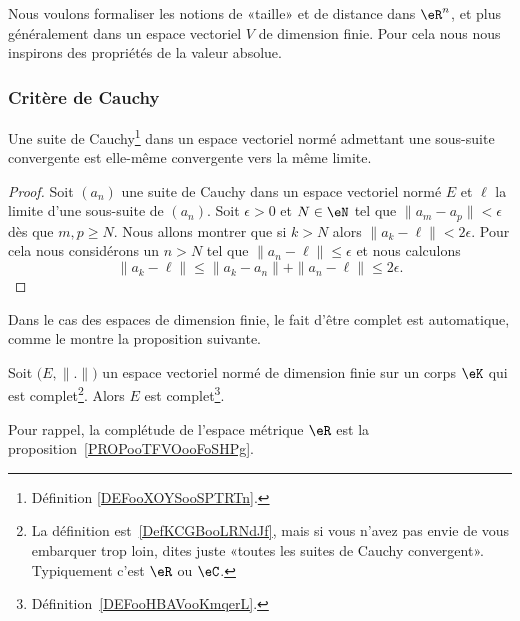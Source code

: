 Nous voulons formaliser les notions de «taille» et de distance dans $\eR^n$, et plus généralement dans un espace vectoriel $V$ de dimension finie. Pour cela nous nous inspirons des propriétés de la valeur absolue.



\subsubsection{Critère de Cauchy}

\begin{lemma}
    Une suite de Cauchy\footnote{Définition \ref{DEFooXOYSooSPTRTn}.} dans un espace vectoriel normé admettant une sous-suite convergente est elle-même convergente vers la même limite.
\end{lemma}

\begin{proof}
    Soit \( (a_n)\) une suite de Cauchy dans un espace vectoriel normé \( E\) et \( \ell\) la limite d'une sous-suite de \( (a_n)\). Soit \( \epsilon>0\) et \( N\in \eN\) tel que \( \| a_m-a_p \|<\epsilon\) dès que \( m,p\geq N\). Nous allons montrer que si \( k>N\) alors \( \| a_k-\ell \|<2\epsilon\). Pour cela nous considérons un \( n>N\) tel que \( \| a_n-\ell \|\leq \epsilon\) et nous calculons
    \begin{equation}
        \| a_k-\ell \|\leq \| a_k-a_n \|+\| a_n-\ell \|\leq 2\epsilon.
    \end{equation}
\end{proof}

Dans le cas des espaces de dimension finie, le fait d'être complet est automatique, comme le montre la proposition suivante.
\begin{proposition}     \label{PROPooGJDTooXOoYfw}
    Soit \( \big( E,\| . \| \big)\) un espace vectoriel normé de dimension finie sur un corps \( \eK\) qui est complet\footnote{La définition est~\ref{DefKCGBooLRNdJf}, mais si vous n'avez pas envie de vous embarquer trop loin, dites juste «toutes les suites de Cauchy convergent». Typiquement c'est \( \eR\) ou \( \eC\).}. Alors \( E\) est complet\footnote{Définition~\ref{DEFooHBAVooKmqerL}.}.
\end{proposition}
Pour rappel, la complétude de l'espace métrique \( \eR\) est la proposition~\ref{PROPooTFVOooFoSHPg}.

